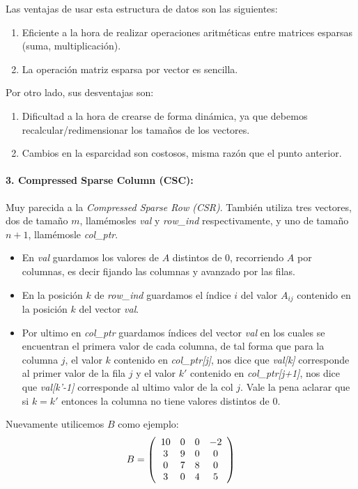 Las ventajas de usar esta estructura de datos son las siguientes:
\begin{enumerate}
  \item Eficiente a la hora de realizar operaciones aritméticas entre matrices esparsas (suma, multiplicación).
  \item La operación matriz esparsa por vector es sencilla.
\end{enumerate}
Por otro lado, sus desventajas son:
\begin{enumerate}
  \item Dificultad a la hora de crearse de forma dinámica, ya que debemos recalcular/redimensionar los tamaños de los vectores.
  \item Cambios en la esparcidad son costosos, misma razón que el punto anterior.
\end{enumerate}

\paragraph{3. Compressed Sparse Column (CSC):}

Muy parecida a la \textit{Compressed Sparse Row (CSR)}.
 También utiliza tres vectores, dos de tamaño $m$, llamémosles \textit{val} y \textit{row_ind} respectivamente, y uno de tamaño $n+1$, llamémosle \textit{col_ptr}.

 \begin{itemize}
     \item En \textit{val} guardamos los valores de $A$ distintos de 0, recorriendo $A$ por columnas, es decir fijando las columnas y avanzado por las filas.
     \item En la posición $k$ de \textit{row_ind} guardamos el índice $i$ del valor $A_{ij}$ contenido en la posición $k$ del vector \textit{val}.
     \item Por ultimo en \textit{col_ptr} guardamos índices del vector \textit{val} en los cuales se encuentran el primera valor de cada columna, de tal forma que para la columna $j$, el valor $k$ contenido en \textit{col_ptr[j]}, nos dice que \textit{val[k]} corresponde al primer valor de la fila $j$ y el valor $k'$ contenido en \textit{col_ptr[j+1]}, nos dice que \textit{val[k'-1]} corresponde al ultimo valor de la col $j$. Vale la pena aclarar que si $k = k'$ entonces la columna no tiene valores distintos de 0.
 \end{itemize}

Nuevamente utilicemos $B$ como ejemplo:
\[
  B = \left(\begin{array}{*5{c}}
    10 & 0 & 0 & -2\\
    3  & 9 & 0 & 0 \\
    0  & 7 & 8 & 0 \\
    3  & 0 & 4 & 5
  \end{array}\right)
\]

